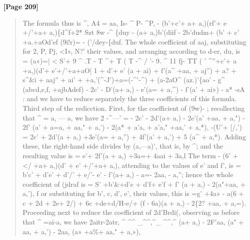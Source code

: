 \documentclass[11pt,a4paper]{book}
\begin{document}
\textbf{[Page 209]}\\[0.2cm]
\begin{quote}
The formula thus is
\textasciicircum{}, A4 = aa, Is- \textasciicircum{} P- \textasciicircum{}P, - (b'+c'+ a+ a,)(rf'+ e +/'+a+ a,)\{d\textasciicircum{}f+2* Szt 8w -\textasciicircum{} \{duy
- (a+ a,)b'(diif - 2b'dudm+ (b' + c' +a.+aOd'ef (9i!r)= - ('/dey-\{duf.
The whole coefficient of aaj, substituting for 2, P, Pj, <I», N?' their values, and arranging
according to d-er, du, is
= (a«)=| < S'+ 9 \textasciicircum{} .T - T \textasciicircum{}+ T ( T -\textasciicircum{} / '- 9. \textasciicircum{} 11 fj- TT ( ' \textasciicircum{}''+c'+ a +a,)(d'+ e'+/'+a+aO| 1
+ d'+ e' (a + ai) + f'(a\textasciicircum{} +aa, + aj'') + a? + s\textasciicircum{}\&i + aaj'' + ai'
+ +a,'(\textasciicircum{}-J')+a=(-\textasciicircum{}'-\textasciicircum{}) + (a-2aO\textasciicircum{}
(az.)'\{ao'
- g\textasciicircum{} (abcd,e,f, +ajbAdef) - 2c' - D'(a+ a,) - e'(a= + a,\textasciicircum{}) - f'(a' + ai») - a* -sA :
and we have to reduce separately the three coefficients of this formula.
Third step of the redicction.
First, for the coefficient of (9w)- ; recollecting that \textasciicircum{} = a, --- a, we have
2 -\textasciicircum{}---' = - 2c' - 2d'(a+ a,) - 2e'(a' +aa, + a,") - 2f' (a' + a=a, + aa," + a,')
- 2(a* + a'a, + a'a," +aa,' + a,*),
-(U'+ [/,') = 2c' + 2d'(a + a,) +3e'(a= + a,'') + 4f'(a' + a,') + 5 (a\textasciicircum{} + a,*).
Adding these, the right-hand side divides by (a,---a)', that is, by \textasciicircum{}; and the resulting
value is
= e'+ 2f'(a + a,) +3a=+ 4aai + 3a,l
The term - (6' + </ +a+ a,)(d' + e' +/'+a+ a,), attending to the values of e' and f', is
= b'c' + d'e' + d'/' + e/'- e' - f'(a+ a,) - a=- 2aa, - a,'';
hence the whole coefficient of (jdraf is
= S' +b'\&+d'e + d'f+ e'f + f' (a + a,) - 2(a"+aa, + a,'),
f
or substituting for b', c, d', e', their values, this is
=g' +4a» - a(6 + c + 2d + 2e+ 2/) + 6c +de+d/H-e/+ (f - 6a)(a + a,) - 2\{2? +aa, + a,=).
Proceeding next to reduce the coefficient of 2d'Brdi(, observing as before that \textasciicircum{}
=ai-a,
we have
2aitr-2atr, \textasciicircum{} \textasciicircum{}\textasciicircum{} \_\textasciicircum{}\textasciicircum{},\textasciicircum{}\_ \textasciicircum{}\textasciicircum{},\textasciicircum{} (a+ a,) - 2F'aa, (a" + aa, + a,') - 2aa, (a» +a\%+ aa," + a,»),
\end{quote}
\end{document}
